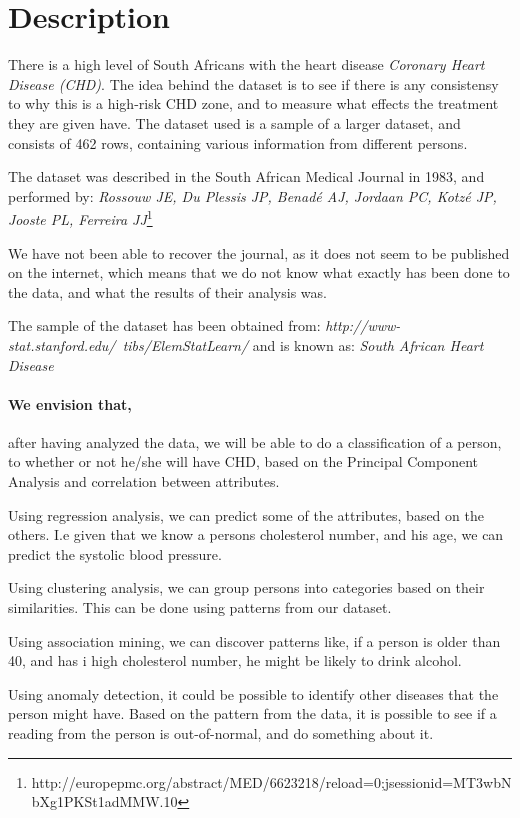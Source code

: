 \section{Description}
There is a high level of South Africans with the heart disease \textit{Coronary Heart Disease (CHD)}. The idea behind the dataset is to see if there is any consistensy to why this is a high-risk CHD zone, and to measure what effects the treatment they are given have. The dataset used is a sample of a larger dataset, and consists of 462 rows, containing various information from different persons.

The dataset was described in the South African Medical Journal in 1983, and performed by: \textit{Rossouw JE, Du Plessis JP, Benadé AJ, Jordaan PC, Kotzé JP, Jooste PL, Ferreira JJ}\footnote{http://europepmc.org/abstract/MED/6623218/reload=0;jsessionid=MT3wbNbXg1PKSt1adMMW.10}

We have not been able to recover the journal, as it does not seem to be published on the internet, which means that we do not know what exactly has been done to the data, and what the results of their analysis was.

The sample of the dataset has been obtained from: \textit{http://www-stat.stanford.edu/~tibs/ElemStatLearn/} and is known as: \textit{South African Heart Disease}

\paragraph{We envision that,} after having analyzed the data, we will be able to do a classification of a person, to whether or not he/she will have CHD, based on the Principal Component Analysis and correlation between attributes.

Using regression analysis, we can predict some of the attributes, based on the others. I.e given that we know a persons cholesterol number, and his age, we can predict the systolic blood pressure.

Using clustering analysis, we can group persons into categories based on their similarities. This can be done using patterns from our dataset.

Using association mining, we can discover patterns like, if a person is older than 40, and has i high cholesterol number, he might be likely to drink alcohol.

Using anomaly detection, it could be possible to identify other diseases that the person might have. Based on the pattern from the data, it is possible to see if a reading from the person is out-of-normal, and do something about it.

